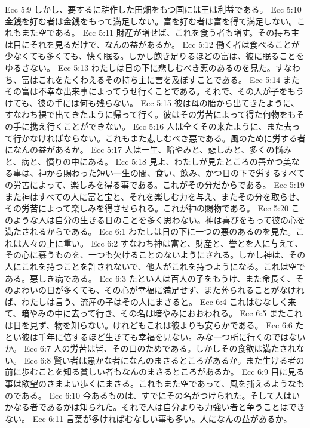 Ecc 5:9  しかし、要するに耕作した田畑をもつ国には王は利益である。
Ecc 5:10  金銭を好む者は金銭をもって満足しない。富を好む者は富を得て満足しない。これもまた空である。
Ecc 5:11  財産が増せば、これを食う者も増す。その持ち主は目にそれを見るだけで、なんの益があるか。
Ecc 5:12  働く者は食べることが少なくても多くても、快く眠る。しかし飽き足りるほどの富は、彼に眠ることをゆるさない。
Ecc 5:13  わたしは日の下に悲しむべき悪のあるのを見た。すなわち、富はこれをたくわえるその持ち主に害を及ぼすことである。
Ecc 5:14  またその富は不幸な出来事によってうせ行くことである。それで、その人が子をもうけても、彼の手には何も残らない。
Ecc 5:15  彼は母の胎から出てきたように、すなわち裸で出てきたように帰って行く。彼はその労苦によって得た何物をもその手に携え行くことができない。
Ecc 5:16  人は全くその来たように、また去って行かなければならない。これもまた悲しむべき悪である。風のために労する者になんの益があるか。
Ecc 5:17  人は一生、暗やみと、悲しみと、多くの悩みと、病と、憤りの中にある。
Ecc 5:18  見よ、わたしが見たところの善かつ美なる事は、神から賜わった短い一生の間、食い、飲み、かつ日の下で労するすべての労苦によって、楽しみを得る事である。これがその分だからである。
Ecc 5:19  また神はすべての人に富と宝と、それを楽しむ力を与え、またその分を取らせ、その労苦によって楽しみを得させられる。これが神の賜物である。
Ecc 5:20  このような人は自分の生きる日のことを多く思わない。神は喜びをもって彼の心を満たされるからである。
Ecc 6:1  わたしは日の下に一つの悪のあるのを見た。これは人々の上に重い。
Ecc 6:2  すなわち神は富と、財産と、誉とを人に与えて、その心に慕うものを、一つも欠けることのないようにされる。しかし神は、その人にこれを持つことを許されないで、他人がこれを持つようになる。これは空である。悪しき病である。
Ecc 6:3  たとい人は百人の子をもうけ、また命長く、そのよわいの日が多くても、その心が幸福に満足せず、また葬られることがなければ、わたしは言う、流産の子はその人にまさると。
Ecc 6:4  これはむなしく来て、暗やみの中に去って行き、その名は暗やみにおおわれる。
Ecc 6:5  またこれは日を見ず、物を知らない。けれどもこれは彼よりも安らかである。
Ecc 6:6  たとい彼は千年に倍するほど生きても幸福を見ない。みな一つ所に行くのではないか。
Ecc 6:7  人の労苦は皆、その口のためである。しかしその食欲は満たされない。
Ecc 6:8  賢い者は愚かな者になんのまさるところがあるか。また生ける者の前に歩むことを知る貧しい者もなんのまさるところがあるか。
Ecc 6:9  目に見る事は欲望のさまよい歩くにまさる。これもまた空であって、風を捕えるようなものである。
Ecc 6:10  今あるものは、すでにその名がつけられた。そして人はいかなる者であるかは知られた。それで人は自分よりも力強い者と争うことはできない。
Ecc 6:11  言葉が多ければむなしい事も多い。人になんの益があるか。
